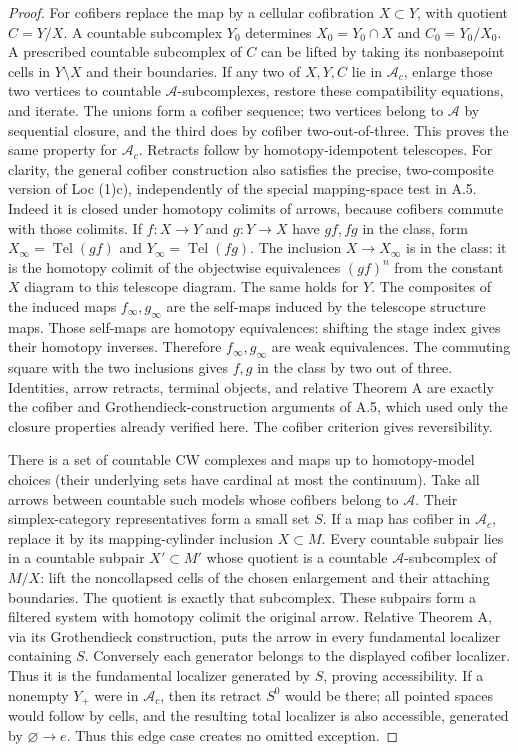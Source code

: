 \begin{proof}
For cofibers replace the map by a cellular cofibration $X\subset Y$, with quotient $C=Y/X$. A countable subcomplex $Y_0$ determines $X_0=Y_0\cap X$ and $C_0=Y_0/X_0$. A prescribed countable subcomplex of $C$ can be lifted by taking its nonbasepoint cells in $Y\setminus X$ and their boundaries. If any two of $X,Y,C$ lie in $\mathcal A_c$, enlarge those two vertices to countable $\mathcal A$-subcomplexes, restore these compatibility equations, and iterate. The unions form a cofiber sequence; two vertices belong to $\mathcal A$ by sequential closure, and the third does by cofiber two-out-of-three. This proves the same property for $\mathcal A_c$. Retracts follow by homotopy-idempotent telescopes. For clarity, the general cofiber construction also satisfies the precise, two-composite version of Loc (1)c), independently of the special mapping-space test in A.5. Indeed it is closed under homotopy colimits of arrows, because cofibers commute with those colimits. If $f:X\to Y$ and $g:Y\to X$ have $gf,fg$ in the class, form $X_\infty=\operatorname{Tel}(gf)$ and $Y_\infty=\operatorname{Tel}(fg)$. The inclusion $X\to X_\infty$ is in the class: it is the homotopy colimit of the objectwise equivalences $(gf)^n$ from the constant $X$ diagram to this telescope diagram. The same holds for $Y$. The composites of the induced maps $f_\infty,g_\infty$ are the self-maps induced by the telescope structure maps. Those self-maps are homotopy equivalences: shifting the stage index gives their homotopy inverses. Therefore $f_\infty,g_\infty$ are weak equivalences. The commuting square with the two inclusions gives $f,g$ in the class by two out of three. Identities, arrow retracts, terminal objects, and relative Theorem A are exactly the cofiber and Grothendieck-construction arguments of A.5, which used only the closure properties already verified here. The cofiber criterion gives reversibility.

There is a set of countable CW complexes and maps up to homotopy-model choices (their underlying sets have cardinal at most the continuum). Take all arrows between countable such models whose cofibers belong to $\mathcal A$. Their simplex-category representatives form a small set $S$. If a map has cofiber in $\mathcal A_c$, replace it by its mapping-cylinder inclusion $X\subset M$. Every countable subpair lies in a countable subpair $X'\subset M'$ whose quotient is a countable $\mathcal A$-subcomplex of $M/X$: lift the noncollapsed cells of the chosen enlargement and their attaching boundaries. The quotient is exactly that subcomplex. These subpairs form a filtered system with homotopy colimit the original arrow. Relative Theorem A, via its Grothendieck construction, puts the arrow in every fundamental localizer containing $S$. Conversely each generator belongs to the displayed cofiber localizer. Thus it is the fundamental localizer generated by $S$, proving accessibility. If a nonempty $Y_+$ were in $\mathcal A_c$, then its retract $S^0$ would be there; all pointed spaces would follow by cells, and the resulting total localizer is also accessible, generated by $\varnothing\to e$. Thus this edge case creates no omitted exception.


\end{proof}
